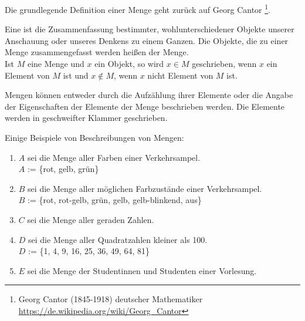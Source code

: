 \begin{Unit}[Definition][Menge]
Die grundlegende Definition einer Menge geht zurück auf Georg Cantor
\footnote{Georg Cantor (1845-1918) deutscher Mathematiker
\url{https://de.wikipedia.org/wiki/Georg_Cantor}}.

\begin{Definition}
Eine  ist die Zusammenfassung bestimmter, 
wohlunterschiedener Objekte unserer Anschauung oder unseres Denkens zu einem 
Ganzen. Die Objekte, die zu einer Menge zusammengefasst werden heißen 
 der Menge. \\
Ist $M$ eine Menge und $x$ ein Objekt, so wird $x \in M$ geschrieben, wenn 
$x$ ein Element von $M$ ist und $x \notin M$, wenn $x$ nicht Element von 
$M$ ist.
\end{Definition}

Mengen können entweder durch die Aufzählung ihrer Elemente oder die Angabe der 
Eigenschaften der Elemente der Menge beschrieben werden. Die Elemente werden in 
geschweifter Klammer geschrieben.
\end{Unit}

\begin{Unit}[Beispiel]
Einige Beispiele von Beschreibungen von Mengen:
\begin{enumerate}
\item
  $A$ sei die Menge aller Farben einer Verkehrsampel. \\
  $A$ := \{rot, gelb, grün\}
\item
  $B$ sei die Menge aller möglichen Farbzustände einer Verkehrsampel. \\
  $B$ := \{rot, rot-gelb, grün, gelb, gelb-blinkend, aus\}
\item
  $C$ sei die Menge aller geraden Zahlen.
\item  
  $D$ sei die Menge aller Quadratzahlen kleiner als 100. \\
  $D$ := \{1, 4, 9, 16, 25, 36, 49, 64, 81\}
\item  
  $E$ sei die Menge der Studentinnen und Studenten einer Vorlesung.
\end{enumerate}
\end{Unit}

